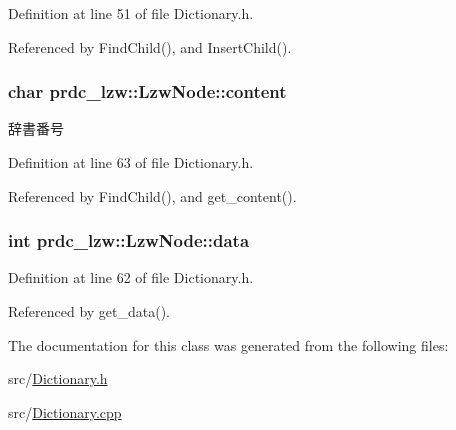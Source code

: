 Definition at line 51 of file Dictionary.\-h.



Referenced by Find\-Child(), and Insert\-Child().

\hypertarget{classprdc__lzw_1_1LzwNode_acb2b7cb34053125cfdf7595aba9bc172}{
\subsubsection[{content}]{\setlength{\rightskip}{0pt plus 5cm}char prdc\-\_\-lzw\-::\-Lzw\-Node\-::content\hspace{0.3cm}{\ttfamily [private]}}}\label{classprdc__lzw_1_1LzwNode_acb2b7cb34053125cfdf7595aba9bc172}


辞書番号 



Definition at line 63 of file Dictionary.\-h.



Referenced by Find\-Child(), and get\-\_\-content().

\hypertarget{classprdc__lzw_1_1LzwNode_ac85178681ea1181b22c3ac43af32515a}{
\subsubsection[{data}]{\setlength{\rightskip}{0pt plus 5cm}int prdc\-\_\-lzw\-::\-Lzw\-Node\-::data\hspace{0.3cm}{\ttfamily [private]}}}\label{classprdc__lzw_1_1LzwNode_ac85178681ea1181b22c3ac43af32515a}


Definition at line 62 of file Dictionary.\-h.



Referenced by get\-\_\-data().



The documentation for this class was generated from the following files\-:\begin{DoxyCompactItemize}
\item 
src/\hyperlink{Dictionary_8h}{Dictionary.\-h}\item 
src/\hyperlink{Dictionary_8cpp}{Dictionary.\-cpp}\end{DoxyCompactItemize}
